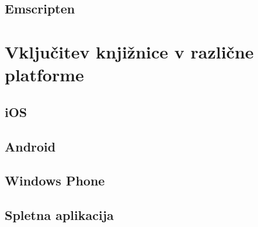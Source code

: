 \section{Emscripten}

\chapter{Vključitev knjižnice v različne platforme}
\label{chap:cross-platform}

\section{iOS}

\section{Android}

\section{Windows Phone}

\section{Spletna aplikacija}
